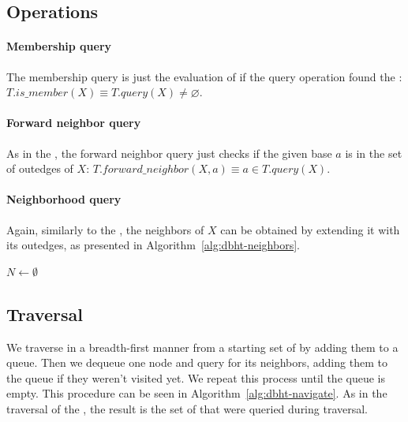 \subsection{\dBHT Operations}

\paragraph*{Membership query} The membership query is just the evaluation of if the query operation found the \kmer: $T.\mathit{is\_member}(X) \equiv T.\mathit{query}(X) \neq \varnothing$.

\paragraph*{Forward neighbor query} As in the \dBCM, the forward neighbor query just checks if the given base $a$ is in the set of outedges of $X$: $T.\mathit{forward\_neighbor}(X, a) \equiv a \in T.\mathit{query}(X)$.

\paragraph*{Neighborhood query} Again, similarly to the \dBCM, the neighbors of $X$ can be obtained by extending it with its outedges, as presented in Algorithm~\ref{alg:dbht-neighbors}.

\begin{algorithm}
	\caption{$T.\mathit{neighbors}(X)$}\label{alg:dbht-neighbors}
  $N \gets \emptyset$\\
\end{algorithm}

\subsection{\dBHT Traversal}

We traverse \dBHT in a breadth-first manner from a starting set of   by adding them to a queue. Then we dequeue one node and query for its neighbors, adding them to the queue if they weren't visited yet. We repeat this process until the queue is empty. This procedure can be seen in Algorithm~\ref{alg:dbht-navigate}. As in the traversal of the \dBCM, the result is the set of  that were queried during traversal.

